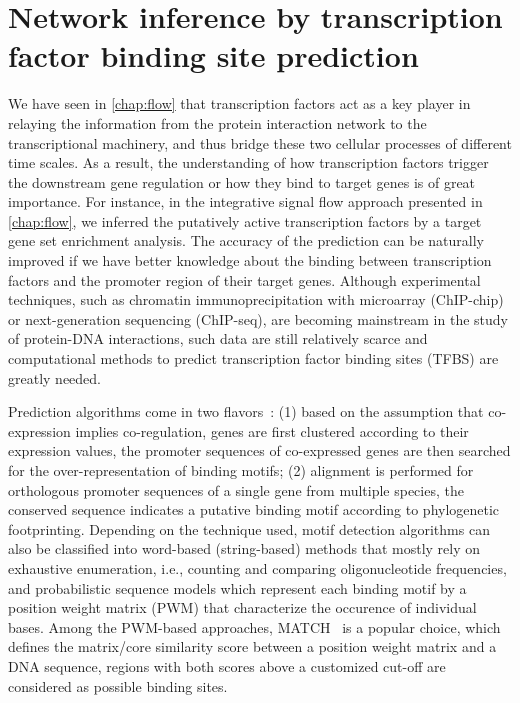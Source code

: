 \section{Network inference by transcription factor binding site prediction}
We have seen in \ref{chap:flow} that transcription factors act as a key player
in relaying the information from the protein interaction network to the
transcriptional machinery, and thus bridge these two cellular processes
of different time scales. As a result, the understanding of how transcription
factors trigger the downstream gene regulation or how they bind to target genes
is of great importance. For instance, in the integrative signal flow approach
presented in \ref{chap:flow}, we inferred the putatively active transcription
factors by a target gene set enrichment analysis. The accuracy of the prediction
can be naturally improved if we have better knowledge about
the binding between transcription factors and the 
promoter region of their target genes. 
Although experimental techniques,
such as chromatin immunoprecipitation with microarray (ChIP-chip) or 
next-generation sequencing (ChIP-seq), are becoming mainstream in the study
of protein-DNA interactions, such data are still relatively scarce and 
computational methods to predict transcription factor binding sites (TFBS) are
greatly needed. 

Prediction algorithms come in two flavors~\citep{Das2007}: 
(1) based on the
assumption that co-expression implies co-regulation, genes are 
first clustered according to their expression values, the promoter sequences
of co-expressed genes are then searched for the over-representation of 
binding motifs; (2) alignment is performed for orthologous promoter sequences of a single gene from multiple species, the conserved sequence indicates a putative
binding motif according to phylogenetic footprinting. Depending on the 
technique used, motif detection algorithms can also be classified into
word-based (string-based) methods that mostly rely on exhaustive enumeration, i.e., counting and comparing oligonucleotide frequencies, and probabilistic sequence models which
represent each binding motif by a position weight matrix (PWM) that characterize
the occurence of individual bases.
Among the PWM-based approaches, MATCH~\citep{Kel2003} is a popular choice, which 
defines the matrix/core similarity score between a position weight matrix and
a DNA sequence, regions with both scores above a customized cut-off are considered
as possible binding sites.

